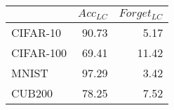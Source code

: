 \begin{tabular}{lrr}
\toprule
{} &  $Acc_{LC}$ &  $Forget_{LC}$ \\
\midrule
CIFAR-10  &       90.73 &           5.17 \\
CIFAR-100 &       69.41 &          11.42 \\
MNIST     &       97.29 &           3.42 \\
CUB200    &       78.25 &           7.52 \\
\bottomrule
\end{tabular}

